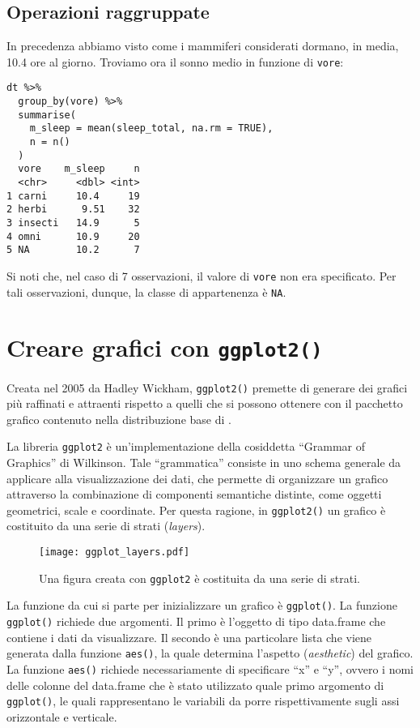 \subsection{Operazioni raggruppate}

In precedenza abbiamo visto come i mammiferi considerati dormano, in media, 10.4 ore al giorno. 
Troviamo ora il sonno medio in funzione di \verb+vore+:
\begin{lstlisting}
dt %>%
  group_by(vore) %>%
  summarise(
    m_sleep = mean(sleep_total, na.rm = TRUE), 
    n = n()
  )
  vore    m_sleep     n
  <chr>     <dbl> <int>
1 carni     10.4     19
2 herbi      9.51    32
3 insecti   14.9      5
4 omni      10.9     20
5 NA        10.2      7
\end{lstlisting}
Si noti che, nel caso di 7 osservazioni, il valore di \verb+vore+ non era specificato. 
Per tali osservazioni, dunque, la classe di appartenenza è \verb+NA+.


\section{Creare grafici con \texttt{ggplot2()}}

Creata nel 2005 da Hadley Wickham, \verb+ggplot2()+ premette di generare dei grafici più raffinati e attraenti rispetto a quelli che si possono ottenere con il pacchetto grafico contenuto nella distribuzione base di \R. 

La libreria \verb+ggplot2+ è un'implementazione della cosiddetta ``Grammar of Graphics'' di Wilkinson. 
Tale ``grammatica'' consiste in uno schema generale da applicare alla visualizzazione dei dati, che permette di organizzare un grafico attraverso la combinazione di componenti semantiche distinte, come oggetti geometrici, scale e coordinate. 
Per questa ragione, in \verb+ggplot2()+ un grafico è costituito da una serie di strati (\emph{layers}). 

 \begin{figure}[h!]
   \centering
    \texttt{[image: ggplot\_layers.pdf]}
   \caption{Una figura creata con \texttt{ggplot2} è costituita da una serie di strati.}
    \label{fig:ggplot2_layers}
  \end{figure}

La funzione da cui si parte per inizializzare un grafico è \verb+ggplot()+. 
La funzione \verb+ggplot()+ richiede due argomenti. 
Il primo è l'oggetto di tipo data.frame che contiene i dati da visualizzare. 
Il secondo è una particolare lista che viene generata dalla funzione \verb+aes()+, la quale determina l'aspetto (\emph{aesthetic}) del grafico. 
La funzione \verb+aes()+ richiede necessariamente di specificare “x” e “y”, ovvero i nomi delle colonne del data.frame che è stato utilizzato quale primo argomento di \verb+ggplot()+, le quali rappresentano le variabili da porre rispettivamente sugli assi orizzontale e verticale.

